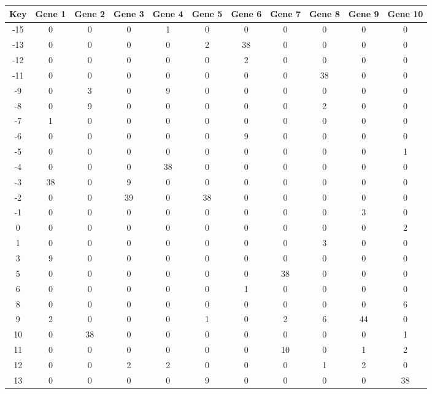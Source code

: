 \begin{tabular}{|c|c|c|c|c|c|c|c|c|c|c|}
\hline
Key & Gene 1 & Gene 2 & Gene 3 & Gene 4 & Gene 5 & Gene 6 & Gene 7 & Gene 8 & Gene 9 & Gene 10 \\
\hline
-15 & 0 & 0 & 0 & 1 & 0 & 0 & 0 & 0 & 0 & 0 \\
-13 & 0 & 0 & 0 & 0 & 2 & 38 & 0 & 0 & 0 & 0 \\
-12 & 0 & 0 & 0 & 0 & 0 & 2 & 0 & 0 & 0 & 0 \\
-11 & 0 & 0 & 0 & 0 & 0 & 0 & 0 & 38 & 0 & 0 \\
-9 & 0 & 3 & 0 & 9 & 0 & 0 & 0 & 0 & 0 & 0 \\
-8 & 0 & 9 & 0 & 0 & 0 & 0 & 0 & 2 & 0 & 0 \\
-7 & 1 & 0 & 0 & 0 & 0 & 0 & 0 & 0 & 0 & 0 \\
-6 & 0 & 0 & 0 & 0 & 0 & 9 & 0 & 0 & 0 & 0 \\
-5 & 0 & 0 & 0 & 0 & 0 & 0 & 0 & 0 & 0 & 1 \\
-4 & 0 & 0 & 0 & 38 & 0 & 0 & 0 & 0 & 0 & 0 \\
-3 & 38 & 0 & 9 & 0 & 0 & 0 & 0 & 0 & 0 & 0 \\
-2 & 0 & 0 & 39 & 0 & 38 & 0 & 0 & 0 & 0 & 0 \\
-1 & 0 & 0 & 0 & 0 & 0 & 0 & 0 & 0 & 3 & 0 \\
0 & 0 & 0 & 0 & 0 & 0 & 0 & 0 & 0 & 0 & 2 \\
1 & 0 & 0 & 0 & 0 & 0 & 0 & 0 & 3 & 0 & 0 \\
3 & 9 & 0 & 0 & 0 & 0 & 0 & 0 & 0 & 0 & 0 \\
5 & 0 & 0 & 0 & 0 & 0 & 0 & 38 & 0 & 0 & 0 \\
6 & 0 & 0 & 0 & 0 & 0 & 1 & 0 & 0 & 0 & 0 \\
8 & 0 & 0 & 0 & 0 & 0 & 0 & 0 & 0 & 0 & 6 \\
9 & 2 & 0 & 0 & 0 & 1 & 0 & 2 & 6 & 44 & 0 \\
10 & 0 & 38 & 0 & 0 & 0 & 0 & 0 & 0 & 0 & 1 \\
11 & 0 & 0 & 0 & 0 & 0 & 0 & 10 & 0 & 1 & 2 \\
12 & 0 & 0 & 2 & 2 & 0 & 0 & 0 & 1 & 2 & 0 \\
13 & 0 & 0 & 0 & 0 & 9 & 0 & 0 & 0 & 0 & 38 \\
\hline
\end{tabular}